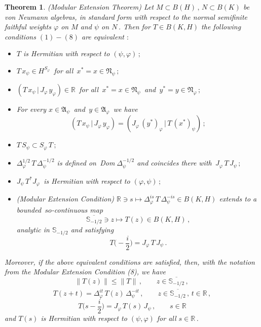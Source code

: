 \documentclass[reqno]{amsart}
\newtheorem{theorem}{Theorem}[section]
\theoremstyle{definition}
\theoremstyle{remark}
\numberwithin{equation}{section}
\theoremstyle{plain}
\begin{document}
\begin{theorem}\label{char.herm}
{\rm (Modular Extension Theorem)}
Let $M\subset B(H)\, ,\, N\subset B(K)$ be von Neumann algebras, in
standard form with respect to the normal semifinite faithful weights
$\varphi$ on $M$ and $\psi$ on $N\,$. Then for $T\in B(K,H)$ the
following conditions $(1) - (8)$ are equivalent $:$
\begin{itemize}
\item[(1)] $T$ is Hermitian with respect to $(\psi ,\varphi )\, ;$
\item[(2)] $T\, x_\psi\in H^{S_\varphi}\,$ for all $\, x^*=x\in
\mathfrak N_\psi\, ;$
\item[(3)] $(T\, x_\psi\, |\, J_\varphi\, y_\varphi )\in\mathbb R\,$
for all $\, x^*=x\in\mathfrak N_\psi\,$ and $\, y^*=y\in
\mathfrak N_\varphi\, ;$
\item[(4)] For every $x\in\mathfrak A_\psi\,$ and $\, y\in
\mathfrak A_\varphi\,$ we have
\begin{equation*}
(T\, x_\psi\, |\, J_\varphi\, y_\varphi )=(J_\varphi\, (y^*)_\varphi
\, |\, T\, (x^*)_\psi )\, ;
\end{equation*}
\item[(5)] $T\, S_\psi\subset S_\varphi\, T\, ;$
\item[(6)] $\Delta_\varphi^{1/2}\, T\,\Delta_\psi^{-1/2}$ is
defined on $\,${\rm Dom}$\;\Delta_\psi^{-1/2}$ and coincides there
with $\, J_\varphi\, T\, J_\psi\, ;$
\item[(7)] $J_\psi\, T^* J_\varphi\,$ is Hermitian with respect to
$(\varphi ,\psi )\, ;$
\item[(8)] {\rm (Modular Extension Condition)} $\mathbb R\ni s
\longmapsto\Delta_\varphi^{is}\, T\,\Delta_\psi^{-is}\in B(K,H)$
extends to a bounded $\, so$-continuous map
\begin{equation*}
\overline{\mathbb S_{-1/2}}\ni z\longmapsto T(z)\in B(K,H)\, ,
\end{equation*}
analytic in $\mathbb S_{-1/2}$ and satisfying
\begin{equation}\label{-i/2}
T\Big( -\frac i2 \Big) =J_\varphi\, T\, J_\psi\, .
\end{equation}
\end{itemize}
Moreover, if the above equivalent conditions are satisfied, then,
with the notation from the {\rm Modular Extension Condition (8)},
we have
\begin{equation}\label{norm}
\| T(z)\|\leq\| T\|\, ,\qquad z\in \overline{\mathbb S_{-1/2}}\, ,
\frac {}{}
\end{equation}
\begin{equation}\label{mod.transl}
T(z+t)=\Delta_\varphi^{it}\, T(z)\,\Delta_\psi^{-it}\, ,\qquad
z\in \overline{\mathbb S_{-1/2}}\, ,\, t\in\mathbb R\, ,
\end{equation}
\begin{equation}\label{transl-i/2}
T\Big( s-\frac i2\Big) =J_\varphi\, T(s)\, J_\psi\, ,\qquad
s\in\mathbb R
\end{equation}
and $T(s)$ is Hermitian with respect to $(\psi ,\varphi )$ for
all $s\in\mathbb R\,$.
\end{theorem}
\end{document}

